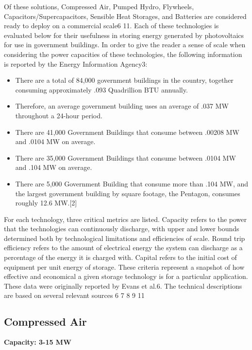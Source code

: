 Of these solutions, Compressed Air, Pumped Hydro, Flywheels,
Capacitors/Supercapacitors, Sensible Heat Storages, and Batteries are
considered ready to deploy on a commercial scale\cite{patrick}{6} \cite{patrick}{11}. Each of these technologies
is evaluated below for their usefulness in storing energy generated by
photovoltaics for use in government buildings. In order to give the reader a
sense of scale when considering the power capacities of these technologies, the
following information is reported by the Energy Information Agency\cite{patrick}{3}:
\begin{itemize}
\item There are a total of 84,000 government buildings in the country, together
consuming approximately .093 Quadrillion BTU annually.
\item Therefore, an average government building uses an average of .037 MW
throughout a 24-hour period.
\item There are 41,000 Government Buildings that consume between .00208 MW and
.0104 MW on average.
\item There are 35,000 Government Buildings that consume between .0104 MW and
.104 MW on average.
\item There are 5,000 Government Building that consume more than .104 MW, and
the largest government building by square footage, the Pentagon, consumes roughly
12.6 MW.[2]
\end{itemize}

For each technology, three critical metrics are listed. Capacity refers to the
power that the technologies can continuously discharge, with upper and lower
bounds determined both by technological limitations and efficiencies of scale.
Round trip efficiency refers to the amount of electrical energy the system can
discharge as a percentage of the energy it is charged with. Capital refers to
the initial cost of equipment per unit energy of storage. These criteria
represent a snapshot of how effective and economical a given storage technology
is for a particular application. These data were originally reported by 
Evans et al.\cite{patrick}{6}. The technical descriptions are based on several
relevant sources \cite{patrick}{6} \cite{patrick}{7} \cite{patrick}{8} \cite{patrick}{9} \cite{patrick}{11}

\subsection{Compressed Air}
\textbf{Capacity: 3-15 MW}

